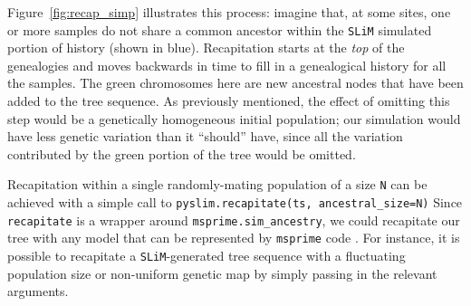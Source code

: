 \documentclass[12pt]{article}
\newcommand{\msprime}[0]{\texttt{msprime}\xspace}
\newcommand{\slim}[0]{\texttt{SLiM}\xspace}
\newcommand*{\ie}{i.e.\xcomma}
\begin{document}
Figure~\ref{fig:recap_simp} illustrates this process: imagine that, at some sites, one or more samples do not share
a common ancestor within the \slim simulated portion of history (shown in blue).
Recapitation starts at the \textit{top} of the genealogies and moves backwards in time
to fill in a genealogical history for all the samples.
The green chromosomes here are new ancestral nodes that have been added to the tree sequence.
As previously mentioned, the effect of omitting this step would be a genetically homogeneous initial population;
our simulation would have less genetic variation than it ``should'' have, since all the variation
contributed by the green portion of the tree would be omitted.


Recapitation within a single randomly-mating population of a size \verb|N|
can be achieved with a simple call to \verb|pyslim.recapitate(ts, ancestral_size=N)|
Since \verb|recapitate| is a wrapper around
\verb|msprime.sim_ancestry|, we could recapitate our tree with any model that can be represented by \msprime code \citep{baumdicker_efficient_2022}.
For instance, it is possible to recapitate a \slim-generated tree sequence with a fluctuating population size
or non-uniform genetic map by simply passing in the relevant arguments.
\end{document}

